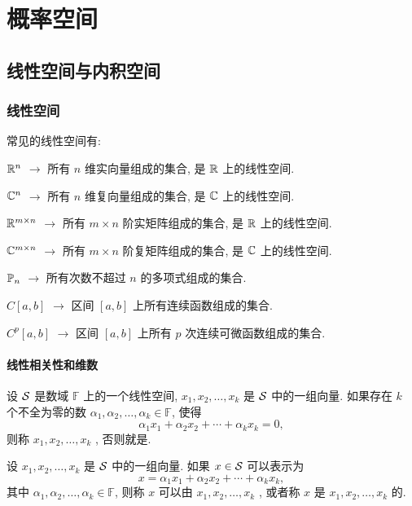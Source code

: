 \chapter{概率空间}

\section{线性空间与内积空间}
\subsection{线性空间}


\begin{example}
	常见的线性空间有:
	\begin{blist}
		\item $\mathbb{R}^n$ $\to$ 所有 $n$ 维实向量组成的集合, 是 $\mathbb{R}$ 上的线性空间.
		\item $\mathbb{C}^n$ $\to$ 所有 $n$ 维复向量组成的集合, 是 $\mathbb{C}$ 上的线性空间.
		\item $\mathbb{R}^{m\times n}$ $\to$ 所有 $m\times n$ 阶实矩阵组成的集合, 是 $\mathbb{R}$ 上的线性空间.
		\item $\mathbb{C}^{m\times n}$ $\to$ 所有 $m\times n$ 阶复矩阵组成的集合,
		是 $\mathbb{C}$ 上的线性空间.
		\item $\mathbb{P}_n$ $\to$ 所有次数不超过 $n$ 的多项式组成的集合.
		\item $C[a,b]$ $\to$ 区间 $[a,b]$ 上所有连续函数组成的集合.
		\item $C^p[a,b]$ $\to$ 区间 $[a,b]$ 上所有 $p$ 次连续可微函数组成的集合.
	\end{blist}
\end{example}

\subsubsection{线性相关性和维数}

设 $\mathcal{S}$ 是数域 $\mathbb{F}$ 上的一个线性空间,
$x_1, x_2, \ldots, x_k$ 是 $\mathcal{S}$ 中的一组向量.
如果存在 $k$ 个不全为零的数 $\alpha_1,\alpha_2,\ldots,\alpha_k\in\mathbb{F}$,
使得
$$ \alpha_1 x_1 + \alpha_2 x_2 + \cdots + \alpha_k x_k = 0,$$
则称 $x_1, x_2, \ldots, x_k$ ,
否则就是.

设 $x_1, x_2, \ldots, x_k$ 是 $\mathcal{S}$ 中的一组向量.
如果 $x\in\mathcal{S}$ 可以表示为
$$ x = \alpha_1 x_1 + \alpha_2 x_2 + \cdots + \alpha_k x_k,$$
其中 $\alpha_1,\alpha_2,\ldots,\alpha_k\in\mathbb{F}$,
则称 $x$ 可以由 $x_1, x_2, \ldots, x_k$ ,
或者称 $x$ 是 $x_1, x_2, \ldots, x_k$ 的.

